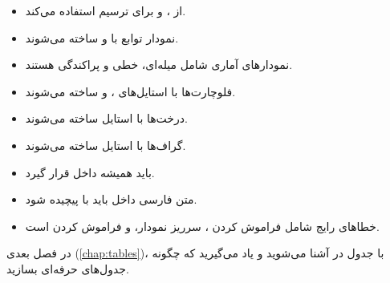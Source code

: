\begin{itemize}
    \item {} از ، 
    و  برای ترسیم استفاده می‌کند.

    \item نمودار توابع با  و
     ساخته می‌شوند.

    \item نمودارهای آماری شامل میله‌ای، خطی و
    پراکندگی هستند.

    \item فلوچارت‌ها با استایل‌های ،
     و  ساخته می‌شوند.

    \item درخت‌ها با استایل  ساخته
    می‌شوند.

    \item گراف‌ها با استایل  ساخته
    می‌شوند.

    \item {} باید همیشه داخل
     قرار گیرد.

    \item متن فارسی داخل  باید
    با  پیچیده شود.

    \item خطاهای رایج شامل فراموش کردن
    ، سرریز نمودار، و فراموش کردن
     است.
\end{itemize}

در فصل بعدی (\cref{chap:tables})، با جدول
در  آشنا می‌شوید و یاد می‌گیرید
که چگونه جدول‌های حرفه‌ای بسازید.